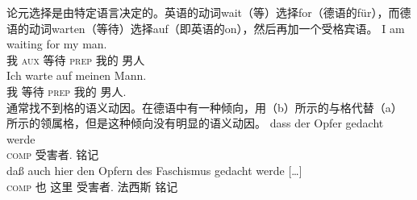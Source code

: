 \begin{exe}
\begin{xlist}[iv.]
\begin{exe}
\begin{xlist}[iv.]
论元选择是由特定语言决定的。英语的动词wait（等）选择for（德语的für），而德语的动词warten（等待）选择auf（即英语的on），然后再加一个受格宾语。
\eal \label{loureed}
\ex 
\gll I am waiting for my man.\\
     我 \textsc{aux} 等待 \textsc{prep} 我的 男人\\
\ex 
\gll Ich warte auf meinen Mann.\\
     我   等待  \textsc{prep}  我的     男人.\acc\\
\zl
通常找不到格的语义动因。在德语中有一种倾向，用（b）所示的与格代替（a）所示的领属格，但是这种倾向没有明显的语义动因。
\eal
\ex 
\gll dass der Opfer gedacht werde\\
     \textsc{comp}  受害者.\gen{} 铭记 \passive{}\\
\ex 
\gll daß auch hier den Opfern des Faschismus gedacht werde [\ldots]\footnotemark\\
     \textsc{comp} 也 这里  受害者.\dat{}  法西斯 铭记 \passive\\

\end{xlist}
\end{exe}
\end{xlist}
\end{exe}
